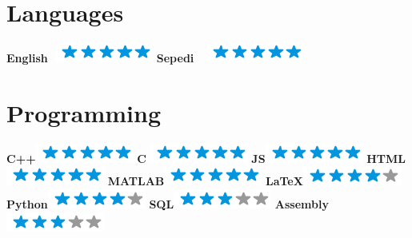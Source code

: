 \documentclass[]{friggeri-cv}
\begin{document}
\begin{aside}
    \section{Languages}
    \textbf{English}\hspace{0.5mm}$\>\>\>$\includegraphics[scale=0.40]{img/5stars.png}
    \textbf{Sepedi}$\>\>\>\>\>$\includegraphics[scale=0.40]{img/5stars.png}
    ~
 \section{Programming}
    \textbf{C++}\hspace{0.9cm}\includegraphics[scale=0.4]{img/5stars.png}
    \textbf{C} \hspace{1.23cm}\includegraphics[scale=0.40]{img/5stars.png}
    \textbf{JS}\hspace{1.14cm}\includegraphics[scale=0.40]{img/5stars.png}
    \textbf{HTML}\hspace{0.60cm}\includegraphics[scale=0.40]{img/5stars.png}
    \textbf{MATLAB}\hspace{0.12cm}\includegraphics[scale=0.40]{img/5stars.png}
    \textbf{\LaTeX}\hspace{0.78cm}\includegraphics[scale=0.40]{img/4stars.png}
    \textbf{Python}\hspace{0.39cm}\includegraphics[scale=0.40]{img/4stars.png}
    \textbf{SQL}\hspace{0.88cm}\includegraphics[scale=0.40]{img/3stars.png}
    \textbf{Assembly}\hspace{-0.02cm}\includegraphics[scale=0.40]{img/3stars.png}
    ~

\end{aside}
\end{document}
